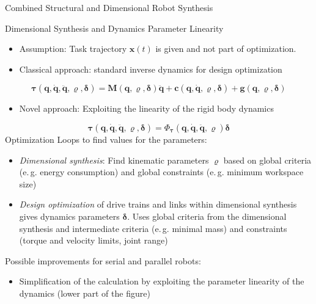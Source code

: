 \documentclass[c]{beamer}
\begin{document}
\begin{frame}
\begin{block}{Combined Structural and Dimensional Robot Synthesis}
{\begin{multicols}{2}
\end{multicols}}
\end{block}
\begin{whiteblock}{Dimensional Synthesis and Dynamics Parameter Linearity}
\parbox{\linewidth}{
\begin{multicols}{2}
\begin{itemize}
    \item Assumption: Task trajectory $\bm{x}(t)$ is given and not part of optimization.
    \item Classical approach: standard inverse dynamics for design optimization
\end{itemize}
\begin{equation}
\bm{\tau}(\bm{q},\dot{\bm{q}},\ddot{\bm{q}},\bm{\varrho},\bm{\delta})
= 
\bm{M}(\bm{q},\bm{\varrho},\bm{\delta}) \ddot{\bm{q}}
+ \bm{c}(\bm{q},\dot{\bm{q}},\bm{\varrho},\bm{\delta})
+ \bm{g}(\bm{q},\bm{\varrho},\bm{\delta})
\label{equ:invdyn_std}
\end{equation}
\begin{itemize}
    \item Novel approach: Exploiting the linearity of the rigid body dynamics
\end{itemize}
\begin{equation}
\bm{\tau}(\bm{q},\dot{\bm{q}},\ddot{\bm{q}},\bm{\varrho},\bm{\delta})
=
\bm{\varPhi}_{\bm{\tau}}(\bm{q},\dot{\bm{q}},\ddot{\bm{q}},\bm{\varrho}) \bm{\delta}
\label{equ:invdyn_plin}
\end{equation}
Optimization Loops to find values for the parameters:
\begin{itemize}
    \item \emph{Dimensional synthesis}: Find kinematic parameters $\bm{\varrho}$ based on global criteria (e.\,g. energy consumption) and global constraints (e.\,g. minimum workspace size)
    \item \emph{Design optimization} of drive trains and links within dimensional synthesis gives dynamics parameters $\bm{\delta}$. Uses global criteria from the dimensional synthesis and intermediate criteria (e.\,g. minimal mass) and constraints (torque and velocity limits, joint range)
\end{itemize}
Possible improvements for serial and parallel robots:
\begin{itemize}
    \item Simplification of the calculation by exploiting the parameter linearity of the dynamics (lower part of the figure)

\end{itemize}
\end{multicols}}
\end{whiteblock}
\end{frame}
\end{document}
